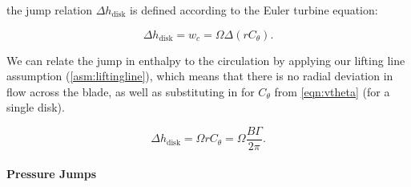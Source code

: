 \where the jump relation \(\Delta h_{\text{disk}}\) is defined according to the Euler turbine equation:

\begin{equation}
    \label{eqn:hjumprel}
    \Delta h_{\text{disk}} = w_c = \Omega \Delta(r C_\theta).
\end{equation}

\noindent We can relate the jump in enthalpy to the circulation by applying our lifting line assumption (\cref{asm:liftingline}),
which means that there is no radial deviation in flow across the blade, as well as substituting in for \(C_\theta\) from \cref{eqn:vtheta} (for a single disk).



\begin{equation}
\label{eqn:hjumprel}
    \Delta h_{\text{disk}} = \Omega r C_\theta = \Omega \frac{B\Gamma}{2\pi}.
\end{equation}











\paragraph{Pressure Jumps}

